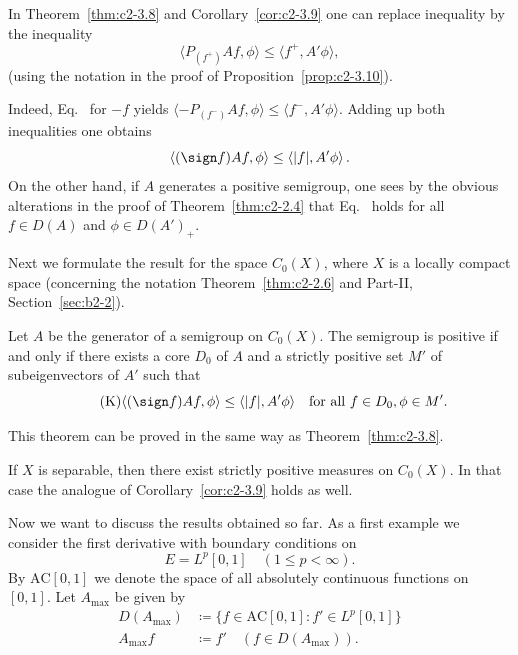 \begin{remark}\label{rem:c2-3.12}
In Theorem~\ref{thm:c2-3.8} and Corollary~\ref{cor:c2-3.9}  one can replace inequality    by the inequality
\begin{equation}\label{eq:c2-3.6}
\langle P_{(f^{+})}Af,\phi \rangle \leq \langle f^{+},A'\phi \rangle,
\end{equation}
(using the notation in the proof of Proposition~\ref{prop:c2-3.10}).

Indeed, Eq.~ for $-f$ yields $\langle -P_{(f^{-})}Af,\phi \rangle \leq \langle f^{-},A'\phi \rangle$. 
Adding up both inequalities one obtains 
\[
\langle(\sign f)Af,\phi \rangle \leq \langle |f|,A'\phi \rangle\,.
\]
On the other hand, if\/ $A$ generates a positive semigroup, one sees by
the obvious alterations in the proof of Theorem~\ref{thm:c2-2.4}   that Eq.~ holds for all $f \in D(A)$ and $\phi \in D(A')_{+}$. 

Next we formulate the result for the space $C_{0}(X)$, where $X$ is a locally compact space (concerning the notation \cf Theorem~\ref{thm:c2-2.6} and Part-II, Section~\ref{sec:b2-2}).
\end{remark}
\begin{theorem}\label{thm:c2-3.13}
Let $A$ be the generator of a semigroup on $C_{0}(X)$.
The semigroup is positive if and only if there exists a core $D_{0}$ of
$A$ and a strictly positive set $M'$ of subeigenvectors of\/ $A'$ such
that
\begin{equation}\label{eq:c2-K7} \tag{K}
\langle(\sign f)Af,\phi \rangle \leq \langle |f|,A'\phi \rangle \quad \text{for all } f \in D_{0}, \phi \in M'.
\end{equation}
\end{theorem}
This theorem can be proved in the same way as Theorem~\ref{thm:c2-3.8}.
\begin{remark*}
If\/ $X$ is separable, then there exist strictly positive
measures on $C_{0}(X)$. 
In that case the analogue of Corollary~\ref{cor:c2-3.9}   holds
as well.
\end{remark*}
Now we want to discuss the results obtained so far.
As a first example we consider the first derivative with boundary
conditions on %
\[
	E = L^{p}[0,1] \quad (1 \leq p < \infty).
\]
%
By $\text{AC}[0,1]$ we denote the space of all absolutely continuous functions on $[0,1]$. 
Let $A_{\max}$ be given by
\begin{align*}
D(A_{\max}) &\coloneq \{f \in \text{AC}[0,1] \colon f' \in L^{p}[0,1]\}\\
A_{\max}f &\coloneq f' \quad (f \in D(A_{\max})).
\end{align*}
